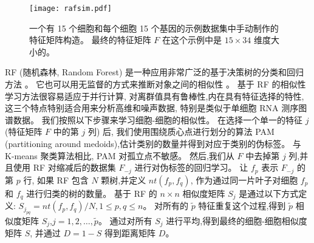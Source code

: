 \begin{figure}[!htbp]
    \centering
    \texttt{[image: rafsim.pdf]}
    \caption{
        一个有 15 个细胞和每个细胞 15 个基因的示例数据集中手动制作的特征矩阵构造。
        最终的特征矩阵 $F$ 在这个示例中是 $15\times34$ 维度大小的。
    }
    \label{fig:rafsim}
\end{figure}

RF (随机森林, Random Forest) 是一种应用非常广泛的基于决策树的分类和回归方法 \cite{breiman2001random}。
它也可以用无监督的方式来推断对象之间的相似性 \cite{shi2006unsupervised,breiman2011manual,pouyan2018random}。
基于 RF 的相似性学习方法很容易适应于并行计算,
对离群值具有鲁棒性,内在具有特征选择的特性,这三个特点特别适合用来分析高维和噪声数据,
特别是类似于单细胞 RNA 测序图谱数据。
我们按照以下步骤来学习细胞-细胞的相似性。
在选择一个单一的特征 $j$ (特征矩阵 $F$ 中的第 $j$ 列) 后, 
我们使用围绕质心点进行划分的算法 PAM (partitioning around medoids),估计类别的数量并得到对应于类别的伪标签。
与 K-means 聚类算法相比, PAM 对孤立点不敏感。
然后,我们从 $F$ 中去掉第 $j$ 列,并且使用 RF 对缩减后的数据集 $F_{-j}$ 进行对伪标签的回归学习。
让 $f_p$ 表示 $F_{-j}$ 的第 $p$ 行,
如果 RF 包含 $N$ 颗树,并定义 $nt(f_p,f_q)$, 作为通过同一片叶子对细胞 $f_p$ 和 $f_q$ 进行归类的树的数量。
基于 RF 的 $n \times n$ 相似度矩阵 $S_j$ 是通过以下方式定义:
$S_{j_{pq}} = nt(f_p,f_q) / N, 1 \le p,q \le n$。
对所有的 $\tilde{p}$ 特征重复这个过程,得到 $\tilde{p}$ 相似度矩阵 $S_j$,$j=1,2,\ldots,\tilde{p}$。
通过对所有 $S_j$ 进行平均,得到最终的细胞-细胞相似度矩阵 $S$,
并通过 $D=1-S$ 得到距离矩阵 $D$。

